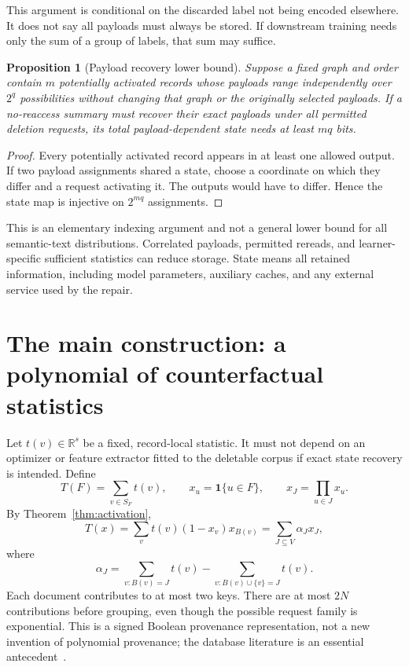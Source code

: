 \documentclass[11pt,a4paper]{article}
\newtheorem{proposition}[theorem]{Proposition}
\theoremstyle{definition}\newtheorem{definition}[theorem]{Definition}
\newcommand{\R}{\mathbb R}\newcommand{\E}{\mathbb E}\newcommand{\1}{\mathbf 1}
\begin{document}
This argument is conditional on the discarded label not being encoded elsewhere. It does not say all payloads must always be stored. If downstream training needs only the sum of a group of labels, that sum may suffice.

\begin{proposition}[Payload recovery lower bound]
Suppose a fixed graph and order contain $m$ potentially activated records whose payloads range independently over $2^q$ possibilities without changing that graph or the originally selected payloads. If a no-reaccess summary must recover their exact payloads under all permitted deletion requests, its total payload-dependent state needs at least $mq$ bits.
\end{proposition}
\begin{proof}
Every potentially activated record appears in at least one allowed output. If two payload assignments shared a state, choose a coordinate on which they differ and a request activating it. The outputs would have to differ. Hence the state map is injective on $2^{mq}$ assignments.
\end{proof}
This is an elementary indexing argument and not a general lower bound for all semantic-text distributions. Correlated payloads, permitted rereads, and learner-specific sufficient statistics can reduce storage. State means all retained information, including model parameters, auxiliary caches, and any external service used by the repair.

\section{The main construction: a polynomial of counterfactual statistics}\label{sec:polynomial}
Let $t(v)\in\R^s$ be a fixed, record-local statistic. It must not depend on an optimizer or feature extractor fitted to the deletable corpus if exact state recovery is intended. Define
\[
 T(F)=\sum_{v\in S_F}t(v),\qquad x_u=\1\{u\in F\},\qquad x_J=\prod_{u\in J}x_u.
\]
By Theorem~\ref{thm:activation},
\begin{equation}\label{eq:poly}
 T(x)=\sum_v t(v)(1-x_v)x_{B(v)}
      =\sum_{J\subseteq V}\alpha_J x_J,
\end{equation}
where
\begin{equation}\label{eq:coeff}
 \alpha_J=\sum_{v:B(v)=J}t(v)
          -\sum_{v:B(v)\cup\{v\}=J}t(v).
\end{equation}
Each document contributes to at most two keys. There are at most $2N$ contributions before grouping, even though the possible request family is exponential. This is a signed Boolean provenance representation, not a new invention of polynomial provenance; the database literature is an essential antecedent~\cite{green2007,amsterdamer2011}.
\end{document}
